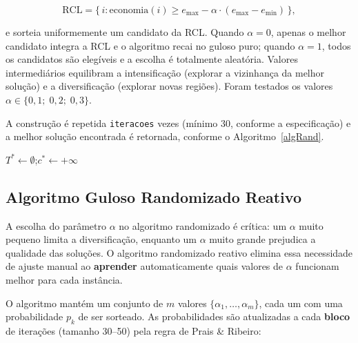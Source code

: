 \documentclass[12pt]{article}
\begin{document}
\begin{equation}
    \text{RCL} = \big\{\, i : \text{economia}(i) \geq e_{\max} - \alpha \cdot (e_{\max} - e_{\min}) \,\big\},
\end{equation}

e sorteia uniformemente um candidato da RCL. Quando $\alpha = 0$, apenas o melhor candidato integra a RCL e o algoritmo recai no guloso puro; quando $\alpha = 1$, todos os candidatos são elegíveis e a escolha é totalmente aleatória. Valores intermediários equilibram a intensificação (explorar a vizinhança da melhor solução) e a diversificação (explorar novas regiões). Foram testados os valores $\alpha \in \{0{,}1;\; 0{,}2;\; 0{,}3\}$.

A construção é repetida \texttt{iteracoes} vezes (mínimo 30, conforme a especificação) e a melhor solução encontrada é retornada, conforme o Algoritmo~\ref{algRand}.

\begin{algorithm}[H]
\caption{Esau--Williams Guloso Randomizado (GRASP)}
\label{algRand}

$T^* \leftarrow \emptyset$;\quad $c^* \leftarrow +\infty$\;
\end{algorithm}

\subsection{Algoritmo Guloso Randomizado Reativo}
\label{subSecAlgRandReact}

A escolha do parâmetro $\alpha$ no algoritmo randomizado é crítica: um $\alpha$ muito pequeno limita a diversificação, enquanto um $\alpha$ muito grande prejudica a qualidade das soluções. O algoritmo randomizado reativo \cite{prais2000} elimina essa necessidade de ajuste manual ao \textbf{aprender} automaticamente quais valores de $\alpha$ funcionam melhor para cada instância.

O algoritmo mantém um conjunto de $m$ valores $\{\alpha_1, \ldots, \alpha_m\}$, cada um com uma probabilidade $p_k$ de ser sorteado. As probabilidades são atualizadas a cada \textbf{bloco} de iterações (tamanho 30--50) pela regra de Prais \& Ribeiro:
\end{document}
